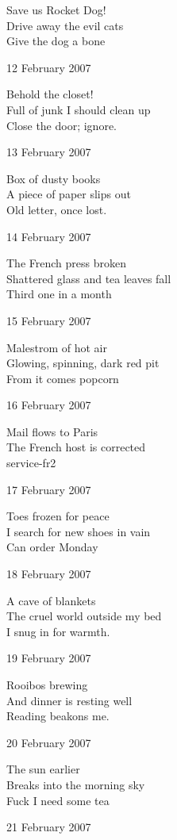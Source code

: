 \documentclass[12pt]{article}
\begin{document}
Save us Rocket Dog! \\
Drive away the evil cats \\
Give the dog a bone 

\newpage

12 February 2007

Behold the closet! \\
Full of junk I should clean up \\
Close the door; ignore. 

13 February 2007

Box of dusty books \\
A piece of paper slips out \\
Old letter, once lost. 

14 February 2007

The French press broken \\
Shattered glass and tea leaves fall \\
Third one in a month 

15 February 2007

Malestrom of hot air \\
Glowing, spinning, dark red pit \\
From it comes popcorn 

16 February 2007

Mail flows to Paris \\
The French host is corrected \\
service-fr2 

17 February 2007

Toes frozen for peace \\
I search for new shoes in vain \\
Can order Monday 

18 February 2007

A cave of blankets \\
The cruel world outside my bed \\
I snug in for warmth. 

\newpage

19 February 2007

Rooibos brewing \\
And dinner is resting well \\
Reading beakons me. 

20 February 2007

The sun earlier \\
Breaks into the morning sky \\
Fuck I need some tea 

21 February 2007
\end{document}
